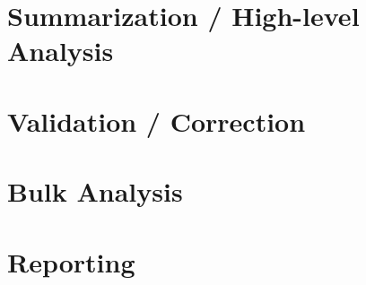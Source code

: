\documentclass[11pt]{article}
\begin{document}
\begin{multicols}{2}
	\section{Summarization / High-level Analysis}\label{sec:sum_highlevel_analysis}
	
	\section{Validation / Correction}\label{sec:validation_correction}
	
	\section{Bulk Analysis}\label{sec:bulk_analysis}
	
	\section{Reporting}\label{sec:reporting}

	\end{multicols}

	\newpage
	
\end{document}
